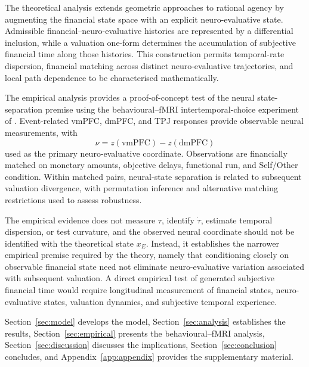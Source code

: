 \documentclass[graybox,natbib]{SNmult}
\providecommand{\1}{}
\renewcommand{\1}{\mathbbm 1}
\begin{document}
The theoretical analysis extends geometric approaches to rational agency
\citep{Stiefenhofer2026GeometryTime,
Stiefenhofer2026EconomicTemporality,
Stiefenhofer2026KantianTime} by augmenting the financial state space with an
explicit neuro-evaluative state. Admissible financial--neuro-evaluative
histories are represented by a differential inclusion, while a valuation
one-form determines the accumulation of subjective financial time along those
histories. This construction permits temporal-rate dispersion, financial
matching across distinct neuro-evaluative trajectories, and local path
dependence to be characterised mathematically.

The empirical analysis provides a proof-of-concept test of the neural
state-separation premise using the behavioural--fMRI intertemporal-choice
experiment of \citet{PivaEtAl2019}. Event-related vmPFC, dmPFC, and TPJ
responses provide observable neural measurements, with
\[
\nu=z(\mathrm{vmPFC})-z(\mathrm{dmPFC})
\]
used as the primary neuro-evaluative coordinate. Observations are financially
matched on monetary amounts, objective delays, functional run, and Self/Other
condition. Within matched pairs, neural-state separation is related to
subsequent valuation divergence, with permutation inference and alternative
matching restrictions used to assess robustness.

The empirical evidence does not measure \(\tau\), identify \(\dot{\tau}\),
estimate temporal dispersion, or test curvature, and the observed neural
coordinate should not be identified with the theoretical state \(x_E\).
Instead, it establishes the narrower empirical premise required by the theory,
namely that conditioning closely on observable financial state need not
eliminate neuro-evaluative variation associated with subsequent valuation.
A direct empirical test of generated subjective financial time would require
longitudinal measurement of financial states, neuro-evaluative states,
valuation dynamics, and subjective temporal experience.

Section~\ref{sec:model} develops the model,
Section~\ref{sec:analysis} establishes the results,
Section~\ref{sec:empirical} presents the behavioural--fMRI analysis,
Section~\ref{sec:discussion} discusses the implications,
Section~\ref{sec:conclusion} concludes, and
Appendix~\ref{app:appendix} provides the supplementary material.








\end{document}
